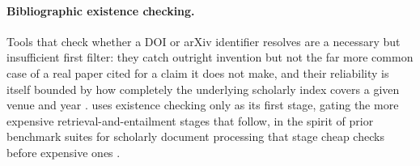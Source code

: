 \paragraph{Bibliographic existence checking.} Tools that check whether a
DOI or arXiv identifier resolves are a necessary but insufficient first
filter: they catch outright invention but not the far more common case of a
real paper cited for a claim it does not make, and their reliability is
itself bounded by how completely the underlying scholarly index covers a
given venue and year \citep{cabrera2020bibliographic}. 
uses existence checking only as its first stage, gating the more expensive
retrieval-and-entailment stages that follow, in the spirit of prior
benchmark suites for scholarly document processing that stage cheap checks
before expensive ones \citep{barreto2022scholarly}.
